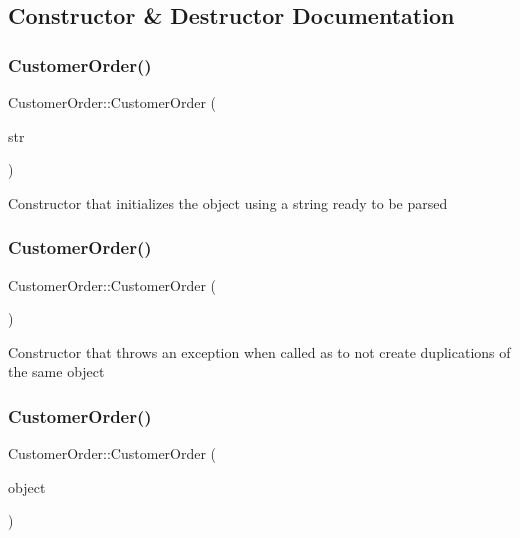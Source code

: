 \subsection{Constructor \& Destructor Documentation}
\mbox{\label{classCustomerOrder_a0b43beee099ac2772cadd8f3df890701}} 
\subsubsection{\texorpdfstring{Customer\+Order()}{CustomerOrder()}\hspace{0.1cm}{\footnotesize\ttfamily [1/3]}}
{\footnotesize\ttfamily Customer\+Order\+::\+Customer\+Order (\begin{DoxyParamCaption}\item[{const std\+::string \&}]{str }\end{DoxyParamCaption})}

Constructor that initializes the object using a string ready to be parsed \mbox{\label{classCustomerOrder_ad5d7da49c28e5006f326e1709b072516}} 
\subsubsection{\texorpdfstring{Customer\+Order()}{CustomerOrder()}\hspace{0.1cm}{\footnotesize\ttfamily [2/3]}}
{\footnotesize\ttfamily Customer\+Order\+::\+Customer\+Order (\begin{DoxyParamCaption}\item[{const \mbox{\hyperlink{classCustomerOrder}{Customer\+Order}} \&}]{ }\end{DoxyParamCaption})}

Constructor that throws an exception when called as to not create duplications of the same object \mbox{\label{classCustomerOrder_addc080f9b7685c1c2d788b418bca40a8}} 
\subsubsection{\texorpdfstring{Customer\+Order()}{CustomerOrder()}\hspace{0.1cm}{\footnotesize\ttfamily [3/3]}}
{\footnotesize\ttfamily Customer\+Order\+::\+Customer\+Order (\begin{DoxyParamCaption}\item[{\mbox{\hyperlink{classCustomerOrder}{Customer\+Order}} \&\&}]{object }\end{DoxyParamCaption})}

